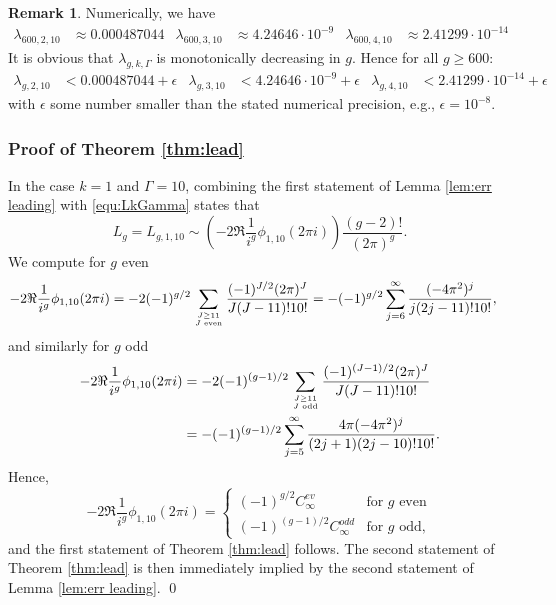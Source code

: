 \documentclass[12pt]{amsart}
\theoremstyle{definition}
\newtheorem{rem}[thm]{Remark}
\numberwithin{equation}{section}
\newcommand{\numcheck}[1]{\cite[Computation #1]{SupplementaryNotebook}}
\theoremstyle{definition} %
\theoremstyle{remark}
\begin{document}
\begin{rem}\label{rem:err leading mono}
Numerically, we have \numcheck{LAEVAL}
\begin{align*}
    \lambda_{600,2,10} &\approx 0.000487044 &
    \lambda_{600,3,10} &\approx 4.24646\cdot 10^{-9}&
    \lambda_{600,4,10} &\approx 2.41299\cdot 10^{-14}
\end{align*}
It is obvious that $\lambda_{g,k,\Gamma}$ is monotonically decreasing in $g$. Hence for all $g\geq 600$:
\begin{align*}
    \lambda_{g,2,10} &< 0.000487044 +\epsilon &
    \lambda_{g,3,10} &< 4.24646\cdot 10^{-9}+\epsilon&
    \lambda_{g,4,10} &< 2.41299\cdot 10^{-14}+\epsilon
\end{align*}
with $\epsilon$ some number smaller than the stated numerical precision, e.g., $\epsilon=10^{-8}$. 
\end{rem}
\subsubsection{Proof of Theorem \ref{thm:lead}}
\label{sec:thm lead proof}
In the case $k=1$ and $\Gamma=10$, combining the first statement of Lemma \ref{lem:err leading} with \eqref{equ:LkGamma} states that 
\[
L_g = L_{g,1,10} \sim \left(-2\Re \frac1{i^g}\phi_{1,10}(2\pi i) \right) \frac{(g-2)!}{(2\pi)^g}.
\]
We compute for $g$ even
\begin{align*}
    -2\Re \frac1{i^g}\phi_{1,10}(2\pi i)
&= 
-2(-1)^{g/2} \sum_{J\geq 11\atop J \text{ even}} \frac{(-1)^{J/2} (2\pi)^J}{J(J-11)! 10!}
=
-(-1)^{g/2}
\sum_{j=6}^\infty \frac{(-4\pi^2)^{j} }{j(2j-11)! 10!},
\end{align*}
and similarly for $g$ odd
\begin{align*}
    -2\Re \frac1{i^g}\phi_{1,10}(2\pi i)
    &= 
    -2
(-1)^{(g-1)/2} \sum_{J\geq 11\atop J \text{ odd}} \frac{(-1)^{(J-1)/2} (2\pi)^J}{J(J-11)! 10!} \\
&=
-
(-1)^{(g-1)/2}
\sum_{j=5}^\infty \frac{4\pi (-4\pi^2)^{j} }{(2j+1)(2j-10)! 10!}.
\end{align*}
Hence,
\[
    -2\Re \frac1{i^g}\phi_{1,10}(2\pi i) 
    =
    \begin{cases}
      (-1)^{g/2} C_\infty^{ev}  & \text{for $g$ even} \\
      (-1)^{(g-1)/2} C_\infty^{odd}  & \text{for $g$ odd},
    \end{cases}
\]
and the first statement of Theorem \ref{thm:lead} follows. 
The second statement of Theorem \ref{thm:lead} is then immediately implied by the second statement of Lemma \ref{lem:err leading}.
\hfill\qed
\end{document}
